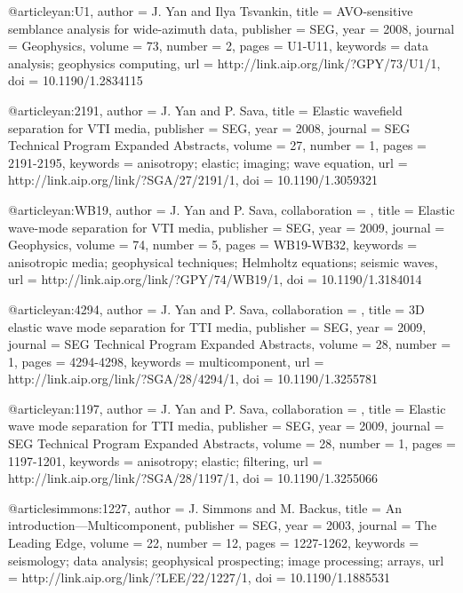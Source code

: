 @article{yan:U1,
  author =	 {J. Yan and Ilya Tsvankin},
  title =	 {AVO-sensitive semblance analysis for wide-azimuth
                  data},
  publisher =	 {SEG},
  year =	 2008,
  journal =	 {Geophysics},
  volume =	 73,
  number =	 2,
  pages =	 {U1-U11},
  keywords =	 {data analysis; geophysics computing},
  url =		 {http://link.aip.org/link/?GPY/73/U1/1},
  doi =		 {10.1190/1.2834115}
}

@article{yan:2191,
  author =	 {J. Yan and P. Sava},
  title =	 {Elastic wavefield separation for {VTI} media},
  publisher =	 {SEG},
  year =	 2008,
  journal =	 {SEG Technical Program Expanded Abstracts},
  volume =	 27,
  number =	 1,
  pages =	 {2191-2195},
  keywords =	 {anisotropy; elastic; imaging; wave equation},
  url =		 {http://link.aip.org/link/?SGA/27/2191/1},
  doi =		 {10.1190/1.3059321}
}




@article{yan:WB19,
author = {J. Yan and P. Sava},
collaboration = {},
title = {Elastic wave-mode separation for {VTI} media},
publisher = {SEG},
year = {2009},
journal = {Geophysics},
volume = {74},
number = {5},
pages = {WB19-WB32},
keywords = {anisotropic media; geophysical techniques; Helmholtz equations; seismic waves},
url = {http://link.aip.org/link/?GPY/74/WB19/1},
doi = {10.1190/1.3184014}
}




@article{yan:4294,
author = {J. Yan and P. Sava},
collaboration = {},
title = {3{D} elastic wave mode separation for {TTI} media},
publisher = {SEG},
year = {2009},
journal = {SEG Technical Program Expanded Abstracts},
volume = {28},
number = {1},
pages = {4294-4298},
keywords = {multicomponent},
url = {http://link.aip.org/link/?SGA/28/4294/1},
doi = {10.1190/1.3255781}
}







@article{yan:1197,
author = {J. Yan and P. Sava},
collaboration = {},
title = {Elastic wave mode separation for {TTI} media},
publisher = {SEG},
year = {2009},
journal = {SEG Technical Program Expanded Abstracts},
volume = {28},
number = {1},
pages = {1197-1201},
keywords = {anisotropy; elastic; filtering},
url = {http://link.aip.org/link/?SGA/28/1197/1},
doi = {10.1190/1.3255066}
}






@article{simmons:1227,
  author =	 {J. Simmons and M. Backus},
  title =	 {An introduction---{M}ulticomponent},
  publisher =	 {SEG},
  year =	 2003,
  journal =	 {The Leading Edge},
  volume =	 22,
  number =	 12,
  pages =	 {1227-1262},
  keywords =	 {seismology; data analysis; geophysical prospecting;
                  image processing; arrays},
  url =		 {http://link.aip.org/link/?LEE/22/1227/1},
  doi =		 {10.1190/1.1885531}
}

